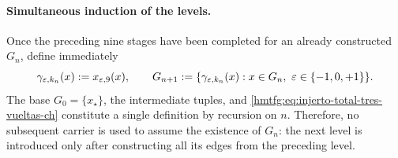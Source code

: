 \paragraph{Simultaneous induction of the levels.}
Once the preceding nine stages have been completed for an already constructed
\(G_n\), define immediately
\begin{equation}
 \gamma_{\varepsilon,k_n}(x):=x_{\varepsilon,9}(x),\qquad
 G_{n+1}:=\{\gamma_{\varepsilon,k_n}(x):
       x\in G_n,\ \varepsilon\in\{-1,0,+1\}\}.
 \label{hmtfg:eq:injerto-total-tres-vueltas-ch}
\end{equation}
\label{hmtfg:eq:tres-vueltas-tpk-ch}
The base \(G_0=\{x_\star\}\), the intermediate tuples, and
\eqref{hmtfg:eq:injerto-total-tres-vueltas-ch} constitute a single definition by
recursion on \(n\). Therefore, no subsequent carrier is used to assume the
existence of \(G_n\): the next level is introduced only after constructing all
its edges from the preceding level.

